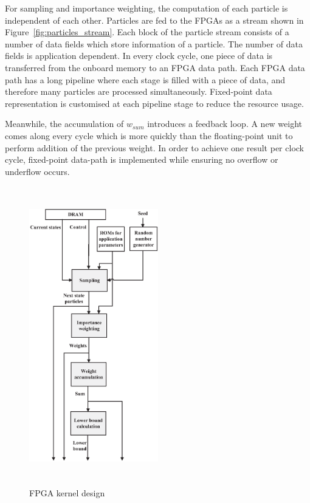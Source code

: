 For sampling and importance weighting, the computation of each particle is independent of each other.
Particles are fed to the FPGAs as a stream shown in Figure~\ref{fig:particles_stream}.
Each block of the particle stream consists of a number of data fields which store information of a particle.
The number of data fields is application dependent.
In every clock cycle, one piece of data is transferred from the onboard memory to an FPGA data path.
Each FPGA data path has a long pipeline where each stage is filled with a piece of data, and therefore many particles are processed simultaneously.
Fixed-point data representation is customised at each pipeline stage to reduce the resource usage.

Meanwhile, the accumulation of $w_{sum}$ introduces a feedback loop.
A new weight comes along every cycle which is more quickly than the floating-point unit to perform addition of the previous weight.
In order to achieve one result per clock cycle, fixed-point data-path is implemented while ensuring no overflow or underflow occurs.

\begin{figure}[t!]
\centering
\includegraphics[width=0.5\textwidth,height=130mm]{runtime_reconfiguration/figures/fig_kernel}
\caption{FPGA kernel design}
\label{fig:kernel}
\end{figure}

